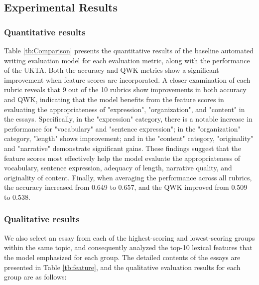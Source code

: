 \subsection{Experimental Results\label{sec:result}}

\subsubsection*{Quantitative results}

Table \ref{tb:Comparison} presents the quantitative results of the baseline automated writing evaluation model for each evaluation metric, along with the performance of the \textsf{UKTA}. 
Both the accuracy and QWK metrics show a significant improvement when feature scores are incorporated. A closer examination of each rubric reveals that 9 out of the 10 rubrics show improvements in both accuracy and QWK, indicating that the model benefits from the feature scores in evaluating the appropriateness of "expression", "organization", and "content" in the essays. Specifically, in the "expression" category, there is a notable increase in performance for "vocabulary" and "sentence expression"; in the "organization" category, "length" shows improvement; and in the "content" category, "originality" and "narrative" demonstrate significant gains. These findings suggest that the feature scores most effectively help the model evaluate the appropriateness of vocabulary, sentence expression, adequacy of length, narrative quality, and originality of content. Finally, when averaging the performance across all rubrics, the accuracy increased from 0.649 to 0.657, and the QWK improved from 0.509 to 0.538.

\subsubsection*{Qualitative results}
We also select an essay from each of the highest-scoring and lowest-scoring groups within the same topic, and consequently analyzed the top-10 lexical features that the model emphasized for each group.  
The detailed contents of the essays are presented in Table \ref{tb:feature}, and the qualitative evaluation results for each group are as follows:

